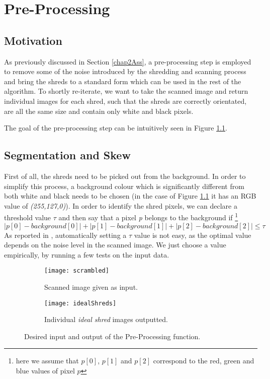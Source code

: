 \chapter{Pre-Processing}
\label{chap6}

\section{Motivation}
As previously discussed in Section \ref{chap2Ass}, a pre-processing step is employed to remove some of the noise introduced by the shredding and scanning process and bring the shreds to a standard form which can be used in the rest of the algorithm. To shortly re-iterate, we want to take the scanned image and return individual images for each shred, such that the shreds are correctly orientated, are all the same size and contain only white and black pixels.

The goal of the pre-processing step can be intuitively seen in Figure \ref{fig:preProc}.

\section{Segmentation and Skew}
First of all, the shreds need to be picked out from the background. In order to simplify this process, a background colour which is significantly different from both white and black needs to be chosen (in the case of Figure \ref{fig:preProc} it has an RGB value of \emph{(255,127,0)}). In order to identify the shred pixels, we can declare a threshold value $\tau$ and then say that a pixel \emph{p} belongs to the background if \footnote{here we assume that $p[0]$, $p[1]$ and $p[2]$ correspond to the red, green and blue values of pixel $p$} \[ |p[0] - background[0]| + |p[1] - background[1]| + |p[2] - background[2]| \leq \tau \] As reported in \cite{P26}, automatically setting a $\tau$ value is not easy, as the optimal value depends on the noise level in the scanned image. We just choose a value empirically, by running a few tests on the input data.

\begin{figure}[H]
        \setlength{\fboxsep}{-0.1cm}
        \centering
        \begin{subfigure}[b]{\textwidth}
                \centering
                \texttt{[image: scrambled]}
                \caption{Scanned image given as input.}
        \end{subfigure}
        \begin{subfigure}[b]{\textwidth}
                \centering
                \texttt{[image: idealShreds]}
        \caption{Individual \emph{ideal shred} images outputted.}
        \end{subfigure}
        \caption{Desired input and output of the Pre-Processing function. }
        \label{fig:preProc}
\end{figure}

